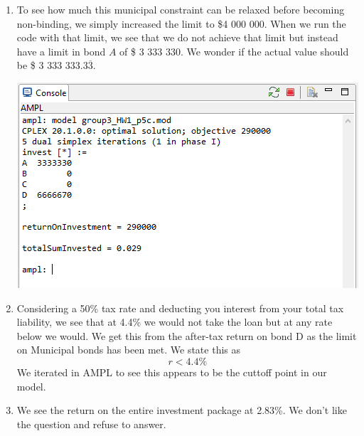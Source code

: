 \documentclass[11pt]{article}
\begin{document}
\begin{enumerate}
\begin{enumerate}
\item To see how much this municipal constraint can be relaxed before becoming non-binding, we simply increased the limit to \$4 000 000.  When we run the code with that limit, we see that we do not achieve that limit but instead have a limit in bond $A$ of \$ 3 333 330.  We wonder if the actual value should be \$ 3 333 333.3$\overline{3}$.

\includegraphics[width = .9\textwidth]{outputp5c.png}

\item Considering a 50\% tax rate and deducting you interest from your total tax liability, we see that at 4.4\% we would not take the loan but at any rate below we would.  We get this from the after-tax return on bond D as the limit on Municipal bonds has been met.  We state this as 
\[
r<4.4\%
\]
We iterated in AMPL to see this appears to be the cuttoff point in our model.

\item We see the return on the entire investment package at 2.83\%.  We don't like the question and refuse to answer. 
\end{enumerate}
\end{enumerate}
\end{document}
